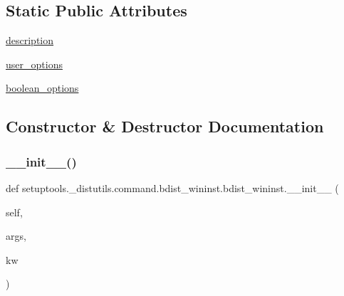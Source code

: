 \subsection*{Static Public Attributes}
\begin{DoxyCompactItemize}
\item 
\hyperlink{classsetuptools_1_1__distutils_1_1command_1_1bdist__wininst_1_1bdist__wininst_a0b22b7f1f19887d11d9ffaed85b23b13}{description}
\item 
\hyperlink{classsetuptools_1_1__distutils_1_1command_1_1bdist__wininst_1_1bdist__wininst_a5f3a1bc68e0289d190b5cfb69b0e223c}{user\+\_\+options}
\item 
\hyperlink{classsetuptools_1_1__distutils_1_1command_1_1bdist__wininst_1_1bdist__wininst_a77c2ae09f37990da6f351c26c51c1606}{boolean\+\_\+options}
\end{DoxyCompactItemize}


\subsection{Constructor \& Destructor Documentation}
\mbox{\label{classsetuptools_1_1__distutils_1_1command_1_1bdist__wininst_1_1bdist__wininst_a011ceeae320912cb05e509f384c75ecb}} 
\subsubsection{\texorpdfstring{\+\_\+\+\_\+init\+\_\+\+\_\+()}{\_\_init\_\_()}}
{\footnotesize\ttfamily def setuptools.\+\_\+distutils.\+command.\+bdist\+\_\+wininst.\+bdist\+\_\+wininst.\+\_\+\+\_\+init\+\_\+\+\_\+ (\begin{DoxyParamCaption}\item[{}]{self,  }\item[{}]{args,  }\item[{}]{kw }\end{DoxyParamCaption})}



